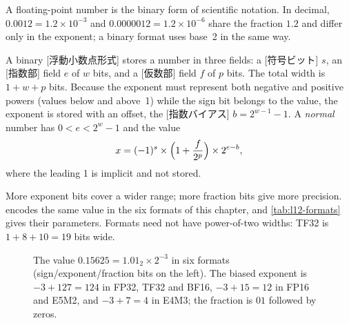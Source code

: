 \documentclass[../main.tex]{subfiles}
\begin{document}
A floating-point number is the binary form of scientific notation.  In
decimal, $0.0012 = 1.2 \times 10^{-3}$ and
$0.0000012 = 1.2 \times 10^{-6}$ share the fraction $1.2$ and differ
only in the exponent; a binary format uses base~2 in the same way.

\begin{definition}
  A binary [浮動小数点形式] stores a number
  in three fields: a [符号ビット] $s$, an
  [指数部] field $e$ of $w$ bits, and a
  [仮数部] field $f$ of $p$ bits.  The total
  width is $1 + w + p$ bits.  Because the exponent must represent both
  negative and positive powers (values below and above~1) while the
  sign bit belongs to the value, the exponent is stored with an offset,
  the [指数バイアス] $b = 2^{w-1} - 1$.  A
  \emph{normal} number has $0 < e < 2^w - 1$ and the value
  \begin{equation}
    x = (-1)^{s} \times \Bigl(1 + \frac{f}{2^{p}}\Bigr) \times 2^{e - b} ,
    \label{eq:l12-normal}
  \end{equation}
  where the leading 1 is implicit and not stored.
\end{definition}

More exponent bits cover a wider range; more fraction bits give more
precision.   encodes the same value in the six
formats of this chapter, and \cref{tab:l12-formats} gives their
parameters.  Formats need not have power-of-two widths:
TF32 is $1 + 8 + 10 = 19$ bits wide.

\begin{figure}[tb]
  \centering
  
  \caption{The value $0.15625 = 1.01_2 \times 2^{-3}$ in six formats
    (sign/exponent/fraction bits on the left).  The biased exponent is
    $-3 + 127 = 124$ in FP32, TF32 and BF16, $-3 + 15 = 12$ in FP16 and
    E5M2, and $-3 + 7 = 4$ in E4M3; the fraction is $01$ followed by
    zeros.}
  \label{fig:l12-formats}
\end{figure}
\end{document}
